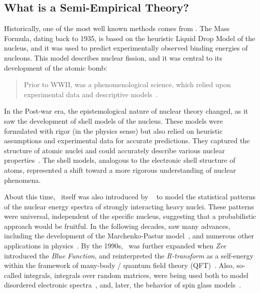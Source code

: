 \subsection{What is a Semi-Empirical Theory?}

Historically, one of the most well known \emph{\SemiEmpirical} methods comes from \NuclearPhysics.
The \SemiEmpirical Mass Formula, dating back to 1935, is based on the heuristic Liquid Drop Model of the nucleus,
and it was used to predict experimentally observed binding energies of nucleons. 
This model describes nuclear fission, and it was central to its development of the atomic bomb:
\begin{quote}
  Prior to WWII, \NuclearPhysics was a phenomenological science, which relied upon experimental data and descriptive
  models~\cite{Negele05}.
\end{quote}
In the Post-war era, the epistemological nature of nuclear theory changed,
as it saw the development of \SemiEmpirical shell models of the nucleus.
These models were formulated with rigor (in the physics sense)
but also relied on heuristic assumptions and experimental data for accurate predictions.
They captured the structure of atomic nuclei
and could accurately describe various nuclear properties~\cite{Ivanenko1932, GoeppertMayer1949, Jensen1949}.
The shell models, analogous to the electronic shell structure of atoms,
represented a shift toward a more rigorous understanding of nuclear phenomena.

About this time, \RMT~itself was also introduced by \emph{\Wigner}~\cite{Wigner55}
to model the statistical patterns of the nuclear energy spectra of strongly interacting heavy nuclei.
These patterns were universal, independent of the specific nucleus,
suggesting that a probabilistic approach would be fruitful.
In the following decades, \RMT saw many advances, including the development of
the Marchenko-Pastur model~\cite{MarchenkoPastur1967},
and numerous other applications in physics~\cite{Guhr1998}.
By the 1990s, \RMT~was further expanded when \emph{Zee} introduced the \emph{Blue Function},
and reinterpreted the \emph{R-transform} as a self-energy within the
framework of many-body / quantum field theory (QFT)~\cite{Zee1996}.
Also, so-called \HCIZtext integrals, integrals over random matrices,
were being used both to model disordered electronic spectra~\cite{SchultenRMT},
and, later, the behavior of spin glass models~\cite{Bouchaud1998,Cherrier_2003}.


